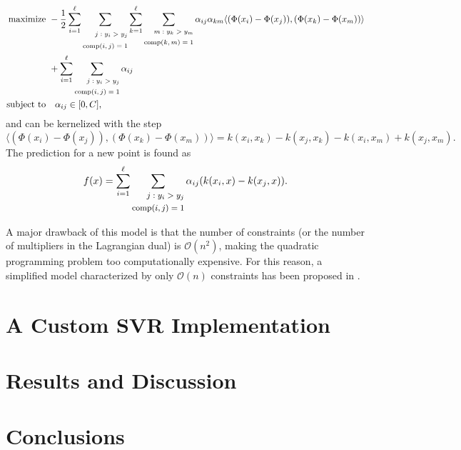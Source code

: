\documentclass[12pt]{report}
\begin{document}
\begin{equation} \label{ranksvmcdual}
\begin{split}
\text{maximize} &\
-\dfrac{1}{2}\sum_{i=1}^{\ell}\sum_{\scriptsize\begin{split} j:y_{i} > y_{j} \\ \text{comp}(i,j) = 1 \end{split}}\sum_{k=1}^{\ell}\sum_{\scriptsize\begin{split} m:y_{k} > y_{m} \\ \text{comp}(k,m) = 1 \end{split}}\alpha_{ij}\alpha_{km}\langle (\Phi(x_{i}) - \Phi(x_{j})),(\Phi(x_{k}) - \Phi(x_{m}))\rangle \\ &\ + \sum_{i=1}^{\ell}\sum_{\scriptsize\begin{split} j:y_{i} > y_{j} \\ \text{comp}(i,j) = 1 \end{split}}\alpha_{ij} \\
\text{subject to} &\quad \alpha_{ij} \in [0,C] \text{,}
\end{split}
\end{equation}
and can be kernelized with the step
\begin{equation} \label{ranksvmckern}
\langle (\Phi(x_{i}) - \Phi(x_{j})),(\Phi(x_{k}) - \Phi(x_{m}))\rangle = k(x_{i},x_{k})-k(x_{j},x_{k})-k(x_{i},x_{m})+k(x_{j},x_{m}) \text{.}
\end{equation}
The prediction for a new point is found as
\begin{equation} \label{ranksvmcf}
f(x) = \sum_{i=1}^{\ell}\sum_{\footnotesize\begin{split} j:y_{i} > y_{j} \\ \text{comp}(i,j) = 1 \end{split}}\alpha_{ij}(k(x_{i},x) - k(x_{j},x)) \text{.}
\end{equation}

A major drawback of this model is that the number of constraints (or the number of multipliers in the Lagrangian dual) is $\mathcal{O}(n^{2})$, making the quadratic programming problem too computationally expensive. For this reason, a simplified model characterized by only $\mathcal{O}(n)$ constraints has been proposed in \cite{vanbelle08}.

\chapter{A Custom SVR Implementation}
\label{chcustsvr}

\chapter{Results and Discussion}
\label{chres}

\chapter*{Conclusions}
\label{concl}

%
%
 

% 
\end{document}
